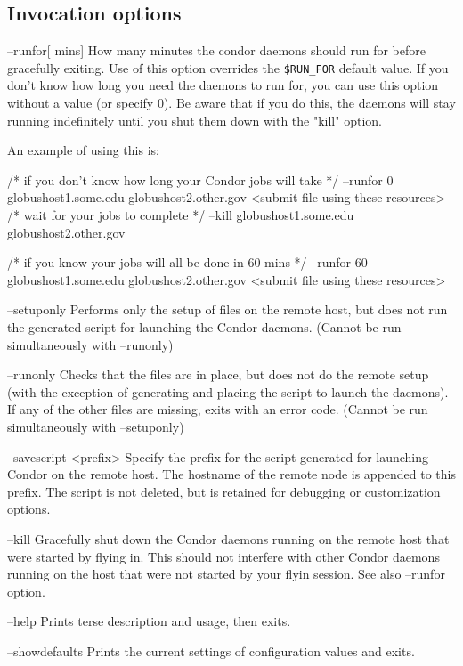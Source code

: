 \subsection{Invocation options}
--runfor[ mins]
   How many minutes the condor daemons should run for before gracefully
   exiting. Use of this option overrides the \texttt{\$RUN\_FOR} default value.
   If you don't know how long you need the daemons to run for, you
   can use this option without a value (or specify 0).
   Be aware that if you do this, the daemons will stay running indefinitely
   until you shut them down with the "kill" option.

   An example of using this is:

      /* if you don't know how long your Condor jobs will take */
       --runfor 0 globushost1.some.edu globushost2.other.gov
       <submit file using these resources>
      /* wait for your jobs to complete */
       --kill globushost1.some.edu globushost2.other.gov

      /* if you know your jobs will all be done in 60 mins */
       --runfor 60 globushost1.some.edu globushost2.other.gov
       <submit file using these resources>

--setuponly
   Performs only the setup of files on the remote host, but does not
   run the generated script for launching the Condor daemons.
   (Cannot be run simultaneously with --runonly)

--runonly
   Checks that the files are in place, but does not do the remote setup
   (with the exception of generating and placing the script to launch
   the daemons). If any of the other files are missing, exits with
   an error code.
   (Cannot be run simultaneously with --setuponly)

--savescript <prefix>
   Specify the prefix for the script generated for launching Condor
   on the remote host. The hostname of the remote node is appended
   to this prefix. The script is not deleted, but is retained for
   debugging or customization options.

--kill
   Gracefully shut down the Condor daemons running on the remote host
   that were started by flying in. This should not interfere with other
   Condor daemons running on the host that were not started by your
   flyin session.
   See also --runfor option.

--help
   Prints terse description and usage, then exits.

--showdefaults
   Prints the current settings of configuration values and exits.

